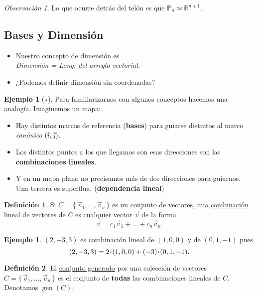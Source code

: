 \documentclass[12pt]{article}
\theoremstyle{plain}
\theoremstyle{definition}
\newtheorem*{Def}{Definición}       %
\newtheorem{Ex}[Th]{Ejemplo}           %
\theoremstyle{remark}
\newtheorem*{Rmk}{Observación}      %
\DeclareMathOperator{\gen}{gen}     %
\newcommand{\ii}{\vu{\imath}}
\newcommand{\jj}{\vu{\jmath}}
\newcommand{\bP}{\mathbb{P}}        %
\newcommand{\bR}{\mathbb{R}}        %
\renewcommand{\:}{\colon}           %
\newcommand{\isom}{\simeq}              %
\newcommand{\un}[1]{\underline{#1}}
\renewcommand{\.}{\Cdot}                %
\newcommand{\set}[1]{\{\,#1\,\}}    %
\begin{document}
\begin{multicols}{2}
\begin{Rmk}
  Lo que ocurre detrás del telón es que $\bP_n\isom\bR^{n+1}$.
\end{Rmk}

\subsection*{Bases y Dimensión}
\begin{itemize}
  \itemsep=-0.4em
  \item Nuestro concepto de dimensión es\\
  \emph{Dimensión  = Long. del arreglo vectorial.}
  \item ¿Podemos definir dimensión sin coordenadas?
\end{itemize} %

\begin{Ex}[$\star$]
  Para familiarizarnos con algunos conceptos hacemos una analogía. Imaginemos un mapa:
  \begin{itemize}
    \itemsep=-0.4em
    \item Hay distintos marcos de referencia (\textbf{bases}) para guiarse distintos al marco \emph{canónico} $(\ii,\jj)$.
    \item Los distintos puntos a los que llegamos con esas direcciones son las \textbf{combinaciones lineales}.
    \item Y en un mapa plano no precisamos más de dos direcciones para guiarnos. Una tercera es superflua. (\textbf{dependencia lineal}) 
  \end{itemize}
\end{Ex}

\begin{Def}
  Si $C=\set{\vec{v}_1,\dots,\vec{v}_n}$ es un conjunto de vectores, una \un{combinación lineal} de vectores de $C$ es cualquier vector $\vec{v}$ de la forma 
  $$\vec{v}=c_1\vec{v}_1+\dots+c_n\vec v_n.$$
\end{Def}

\begin{Ex}
  $(2,-3,3)$ es combinación lineal de $(1,0,0)$ y de $(0,1,-1)$ pues 
 $$(2,-3,3)=2\.(1,0,0)+(-3)\.(0,1,-1).$$
\end{Ex}

\begin{Def}
  El \un{conjunto generado} por una colección de vectores $C=\set{\vec{v}_1,\dots,\vec{v}_n}$ es el conjunto de \textbf{todas} las combinaciones lineales de $C$. Denotamos $\gen(C)$.
\end{Def}


\end{multicols}
\end{document}
